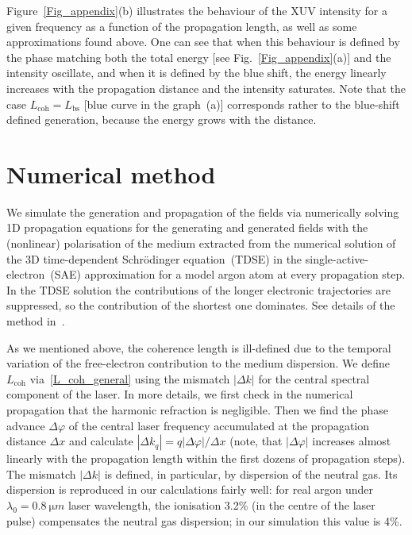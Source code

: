 Figure~\ref{Fig_appendix}(b) illustrates the behaviour of the XUV intensity for a given frequency as a function of the propagation length, as well as some approximations found above. One can see that when this behaviour is defined by the phase matching both the total energy [see Fig.~\ref{Fig_appendix}(a)] and the intensity oscillate, and when it is defined by the blue shift, the energy linearly increases with the propagation distance and the intensity saturates. Note that the case $L_\mathrm{coh}=L_\mathrm{bs}$ [blue curve in the graph~(a)] corresponds rather to the blue-shift defined generation, because the energy grows with the distance. 


%
\section{Numerical method}
\label{numerical}
%
We simulate the generation and propagation of the fields via numerically solving 1D propagation equations for the generating and generated fields with the (nonlinear) polarisation of the medium extracted from the numerical solution of the 3D time-dependent Schr\"odinger equation~(TDSE) in the single-active-electron~(SAE) approximation for a model argon atom at every propagation step. In the TDSE solution the contributions of the longer electronic trajectories are suppressed, so the contribution of the shortest one dominates. See details of the method in~\cite{KhokhlovaStrelkov, Birulia2022}.

As we mentioned above, the coherence length is ill-defined due to the temporal variation of the free-electron contribution to the medium dispersion. We define $L_\mathrm{coh}$ via~\eqref{L_coh_general} using the mismatch $|\Delta k|$ for the central spectral component of the laser. In more details, we first check in the numerical propagation that the harmonic refraction is negligible. Then we find the phase advance $\Delta \varphi$ of the central laser frequency accumulated at the propagation distance $\Delta x$ and calculate $|\Delta k_q|=q |\Delta \varphi|/ \Delta x$ (note, that $|\Delta \varphi|$ increases almost linearly with the propagation length within the first dozens of propagation steps). The mismatch $|\Delta k|$ is defined, in particular, by dispersion of the neutral gas. Its dispersion is reproduced in our calculations fairly well: for real argon under $\lambda_0=\SI{0.8}{\micro m}$ laser wavelength, the ionisation 3.2\% (in the centre of the laser pulse) compensates the neutral gas dispersion; in our simulation this value is 4\%.  

